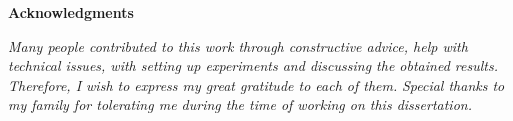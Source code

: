 
\newpage
		
\thispagestyle{empty}
		
{}
{\LARGE\bf{Acknowledgments}}
\vskip 15mm

\vskip 10mm
		
\textnormal{\textit{Many people contributed to this work through constructive advice, help with technical issues, with setting up experiments and discussing the obtained results. Therefore, I wish to express my great gratitude to each of them.}}
\vskip 10mm
\textnormal{\textit{Special thanks to my family for tolerating me during the time of working on this dissertation.}}